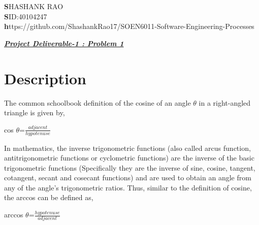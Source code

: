 \documentclass[12pt]{article}
\begin{document}
\begin{flushleft}
	\large\textbf SHASHANK RAO\\
	\large\textbf SID:40104247\\
	\small\textbf https://github.com/ShashankRao17/SOEN6011-Software-Engineering-Processes 
\end{flushleft}
\begin{center}
	\Large\textbf\textit\underline{Project Deliverable-1 : Problem 1} 
	
\end{center}
	\section{Description}
		
		The common schoolbook definition of the cosine of an angle $\theta$ in a right-angled triangle is given by,
		
		\begin{center}
			\Large cos $\theta$=\Large $\frac{adjacent}{hypotenuse}$
		\end{center}	    
		
		In mathematics, the inverse trigonometric functions (also called arcus function, antitrigonometric functions or cyclometric functions) are the inverse of the basic trigonometric functions (Specifically they are the inverse of sine, cosine, tangent, cotangent, secant and cosecant functions) and are used to obtain an angle from any of the angle’s trigonometric ratios. Thus, similar to the definition of cosine, the arccos can be defined as,
		\begin{center}
			\Large arccos $\theta$=\Large$\frac{hypotenuse}{adjacent}$
		\end{center}
	
\end{document}
